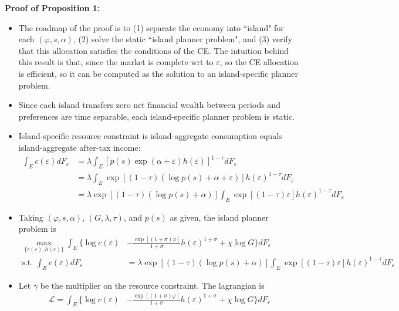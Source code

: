 \documentclass{article}
\newcommand{\Lfn}{\mathcal{L}}
\begin{document}
\bigskip



\textbf{Proof of Proposition 1:} 



\begin{itemize}
\item The roadmap of the proof is to (1) separate the economy into ``island" for each $(\varphi, s, \alpha)$, (2) solve the static ``island planner problem", and (3) verify that this allocation satisfies the conditions of the CE. The intuition behind this result is that, since the market is complete wrt to $\varepsilon$, so the CE allocation is efficient, so it can be computed as the solution to an island-specific planner problem. 
\item Since each island transfers zero net financial wealth between periods and preferences are time separable, each island-specific planner problem is static.
\item Island-specific resource constraint is island-aggregate consumption equals island-aggregate after-tax income:
\begin{align*}
\int_E c(\varepsilon) dF_\varepsilon 
&= \lambda \int_E [ p(s)\exp (\alpha + \varepsilon) h(\varepsilon)]^{1-\tau} dF_\varepsilon\\
&= \lambda \int_E \exp [(1-\tau)(\log p(s)+ \alpha + \varepsilon)] h(\varepsilon)^{1-\tau} dF_\varepsilon\\
&= \lambda \exp [(1-\tau)(\log p(s)+ \alpha)] \int_E \exp [(1-\tau) \varepsilon] h(\varepsilon)^{1-\tau} dF_\varepsilon
\end{align*}
\item Taking $(\varphi, s, \alpha)$, $(G, \lambda, \tau)$, and $p(s)$ as given, the island planner problem is
\begin{align*}
\max_{\{c(\varepsilon), h(\varepsilon)\}} \int_E \Bigg\{ \log c(\varepsilon) &- \frac{\exp[(1+\sigma)\varphi]}{1 + \sigma} h(\varepsilon)^{1+\sigma} + \chi \log G \Bigg\} dF_\varepsilon\\
\text{s.t. } \int_E c(\varepsilon) dF_\varepsilon 
&= \lambda \exp [(1-\tau)(\log p(s)+ \alpha)] \int_E \exp [(1-\tau) \varepsilon] h(\varepsilon)^{1-\tau} dF_\varepsilon
\end{align*}
\item Let $\gamma$ be the multiplier on the resource constraint. The lagrangian is
\begin{align*}
\Lfn = \int_E \Bigg\{ \log c(\varepsilon) &- \frac{\exp[(1+\sigma)\varphi]}{1 + \sigma} h(\varepsilon)^{1+\sigma} + \chi \log G \Bigg\} dF_\varepsilon \\

\end{align*}
\end{itemize}
\end{document}
